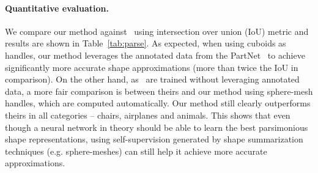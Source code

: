\paragraph*{Quantitative evaluation.}

We compare our method against~\cite{Tulsiani2017, Paschalidou2019} using intersection
over union (IoU) metric and results are shown in Table~\ref{tab:parse}.
As expected, when using cuboids as handles, our method leverages the annotated data from the PartNet~\cite{partnet} to achieve significantly more accurate shape
approximations (more than twice the IoU in comparison).
On the other hand, as~\cite{Tulsiani2017, Paschalidou2019} are trained without leveraging annotated data, a more fair comparison is between theirs and our method using sphere-mesh handles, which are computed automatically.
Our method still clearly outperforms theirs in all categories --
chairs, airplanes and animals.
This shows that even though a neural network in theory should be able to learn the best parsimonious
shape representations, using self-supervision generated by shape summarization techniques (e.g. sphere-meshes) can still help it achieve more accurate approximations. 

